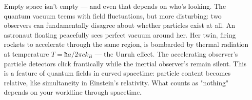 Empty space isn't empty — and even that depends on who's looking. The quantum vacuum teems with field fluctuations, but more disturbing: two observers can fundamentally disagree about whether particles exist at all. An astronaut floating peacefully sees perfect vacuum around her. Her twin, firing rockets to accelerate through the same region, is bombarded by thermal radiation at temperature $T = ħa/2πck_B$ — the Unruh effect. The accelerating observer's particle detectors click frantically while the inertial observer's remain silent. This is a feature of quantum fields in curved spacetime: particle content becomes relative, like simultaneity in Einstein's relativity. What counts as "nothing" depends on your worldline through spacetime.